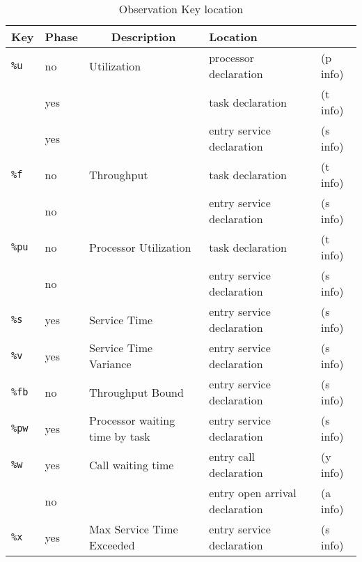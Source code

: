 \begin{table}
  \centering
  \begin{tabular}{|l|l|l|l|l|}
    \hline
    \multicolumn{1}{|c|}{\textbf{Key}}
    &\multicolumn{1}{c|}{\textbf{Phase}}
    &\multicolumn{1}{c|}{\textbf{Description}}
    &\multicolumn{2}{l|}{\textbf{Location}}\\
\hline
  \texttt{\%u}  & no  & Utilization                    & processor declaration          & (p info) \\
                & yes &                                & task declaration               & (t info) \\
                & yes &                                & entry service declaration      & (s info) \\
\hline
  \texttt{\%f}  & no  & Throughput                     & task declaration               & (t info) \\
                & no  &                                & entry service declaration      & (s info) \\
\hline
  \texttt{\%pu} & no  & Processor Utilization          & task declaration               & (t info) \\
                & no  &                                & entry service declaration      & (s info) \\
\hline
  \texttt{\%s}  & yes & Service Time                   & entry service declaration      & (s info) \\
\hline
  \texttt{\%v}  & yes & Service Time Variance          & entry service declaration      & (s info) \\
\hline
  \texttt{\%fb} & no  & Throughput Bound               & entry service declaration      & (s info) \\
\hline
  \texttt{\%pw} & yes & Processor waiting time by task & entry service declaration      & (s info) \\
\hline
  \texttt{\%w}  & yes & Call waiting time              & entry call declaration         & (y info) \\
                & no  &                                & entry open arrival declaration & (a info) \\
\hline
  \texttt{\%x}  & yes & Max Service Time Exceeded      & entry service declaration      & (s info) \\
\hline
  \end{tabular}
  \caption{Observation Key location}
  \label{tab:obs-location}
\end{table}

